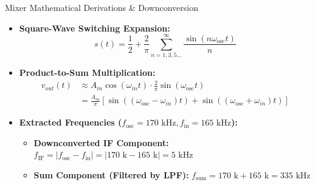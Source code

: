 \documentclass{beamer}
\begin{document}
\begin{frame}{Mixer Mathematical Derivations \& Downconversion}
  \begin{itemize}
    \item \textbf{Square-Wave Switching Expansion:}
    \begin{equation*}
      s(t) = \frac{1}{2} + \frac{2}{\pi}\sum_{n=1,3,5\dots}^{\infty}\frac{\sin(n\omega_{\text{osc}}t)}{n}
    \end{equation*}
    \item \textbf{Product-to-Sum Multiplication:}
    \begin{align*}
      v_{out}(t) &\approx A_{in}\cos(\omega_{in}t) \cdot \frac{2}{\pi}\sin(\omega_{\text{osc}}t) \\
                 &= \frac{A_{in}}{\pi}\left[\sin((\omega_{\text{osc}} - \omega_{in})t) + \sin((\omega_{\text{osc}} + \omega_{in})t)\right]
    \end{align*}
    \item \textbf{Extracted Frequencies ($f_{\text{osc}} = 170\text{ kHz}, f_{\text{in}} = 165\text{ kHz}$):}
    \begin{itemize}
      \item \textbf{Downconverted IF Component:} $f_{\text{IF}} = |f_{\text{osc}} - f_{\text{in}}| = |170\text{ k} - 165\text{ k}| = 5\text{ kHz}$
      \item \textbf{Sum Component (Filtered by LPF):} $f_{\text{sum}} = 170\text{ k} + 165\text{ k} = 335\text{ kHz}$
    \end{itemize}
  \end{itemize}
\end{frame}
\end{document}
